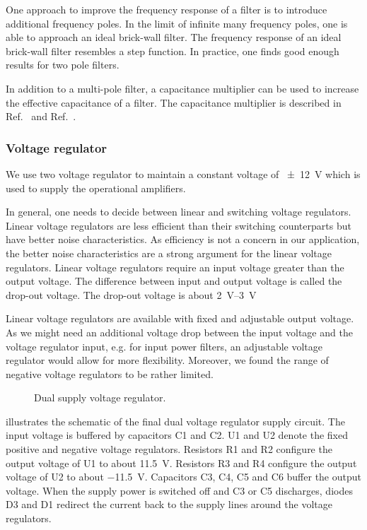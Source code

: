 One approach to improve the frequency response of a filter is to introduce additional frequency poles.
In the limit of infinite many frequency poles, one is able to approach an ideal brick-wall filter.
The frequency response of an ideal brick-wall filter resembles a step function.
In practice, one finds good enough results for two pole filters.

In addition to a multi-pole filter, a capacitance multiplier can be used to increase the effective capacitance of a filter.
The capacitance multiplier is described in Ref.~\cite[p.~536]{Hobbs11} and Ref.~\cite[p.~578]{Horowitz15}.

\subsubsection{Voltage regulator}

We use two voltage regulator to maintain a constant voltage of \SI{\pm12}{\volt} which is used to supply the operational amplifiers.

In general, one needs to decide between linear and switching voltage regulators.
Linear voltage regulators are less efficient than their switching counterparts but have better noise characteristics.
As efficiency is not a concern in our application, the better noise characteristics are a strong argument for the linear voltage regulators.
Linear voltage regulators require an input voltage greater than the output voltage.
The difference between input and output voltage is called the drop-out voltage.
The drop-out voltage is about \SIrange{2}{3}{\volt}

Linear voltage regulators are available with fixed and adjustable output voltage.
As we might need an additional voltage drop between the input voltage and the voltage regulator input, e.g. for input power filters, an adjustable voltage regulator would allow for more flexibility.
Moreover, we found the range of negative voltage regulators to be rather limited.

\begin{figure}[H]
	\centering
	
	\caption{Dual supply voltage regulator.}\label{fig:voltage_regulator_dual}
\end{figure}
 illustrates the schematic of the final dual voltage regulator supply circuit.
The input voltage is buffered by capacitors C1 and C2.
U1 and U2 denote the fixed positive and negative voltage regulators.
Resistors R1 and R2 configure the output voltage of U1 to about \SI[retain-explicit-plus]{+11.5}{\volt}.
Resistors R3 and R4 configure the output voltage of U2 to about \SI[retain-explicit-plus]{-11.5}{\volt}.
Capacitors C3, C4, C5 and C6 buffer the output voltage.
When the supply power is switched off and C3 or C5 discharges,
diodes D3 and D1 redirect the current back to the supply lines around the voltage regulators.

